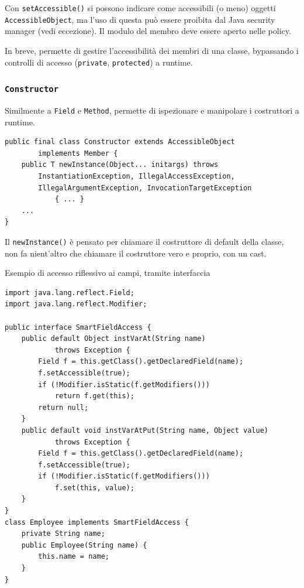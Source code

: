 Con \texttt{setAccessible()} si possono indicare come accessibili (o meno) oggetti \texttt{AccessibleObject}, ma l'uso di questa può essere proibita dal Java security manager (vedi eccezione). Il modulo del membro deve essere aperto nelle policy.

In breve, permette di gestire l'accessibilità dei membri di una classe, bypassando i controlli di accesso (\texttt{private}, \texttt{protected}) a runtime.

\subsubsection{\texttt{Constructor}}

Similmente a \texttt{Field} e \texttt{Method}, permette di ispezionare e manipolare i costruttori a runtime.

\begin{verbatim}
public final class Constructor extends AccessibleObject
        implements Member {
    public T newInstance(Object... initargs) throws
        InstantiationException, IllegalAccessException,
        IllegalArgumentException, InvocationTargetException
            { ... }
    ...
}
\end{verbatim}

Il \texttt{newInstance()} è pensato per chiamare il costruttore di default della classe, non fa nient'altro che chiamare il costruttore vero e proprio, con un cast.



Esempio di accesso riflessivo ai campi, tramite interfaccia
\begin{verbatim}
import java.lang.reflect.Field;
import java.lang.reflect.Modifier;

public interface SmartFieldAccess {
    public default Object instVarAt(String name)
            throws Exception {
        Field f = this.getClass().getDeclaredField(name);
        f.setAccessible(true);
        if (!Modifier.isStatic(f.getModifiers()))
            return f.get(this);
        return null;
    }
    public default void instVarAtPut(String name, Object value)
            throws Exception {
        Field f = this.getClass().getDeclaredField(name);
        f.setAccessible(true);
        if (!Modifier.isStatic(f.getModifiers()))
            f.set(this, value);
    }
}
class Employee implements SmartFieldAccess {
    private String name;
    public Employee(String name) {
        this.name = name;
    }
}
\end{verbatim}

